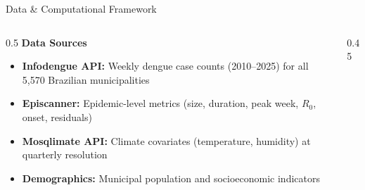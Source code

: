 \documentclass[10pt,aspectratio=169]{beamer}
\begin{document}
\begin{frame}{Data \& Computational Framework}
\begin{columns}[T]
\begin{column}{0.5\textwidth}
\textbf{Data Sources}
\begin{itemize}
    \item \textbf{Infodengue API:} Weekly dengue case counts (2010--2025) for all 5,570 Brazilian municipalities
    \item \textbf{Episcanner:} Epidemic-level metrics (size, duration, peak week, $R_0$, onset, residuals)
    \item \textbf{Mosqlimate API:} Climate covariates (temperature, humidity) at quarterly resolution
    \item \textbf{Demographics:} Municipal population and socioeconomic indicators
\end{itemize}

\vspace{0.3cm}

\end{column}

\begin{column}{0.45\textwidth}


\end{column}
\end{columns}
\end{frame}
\end{document}

